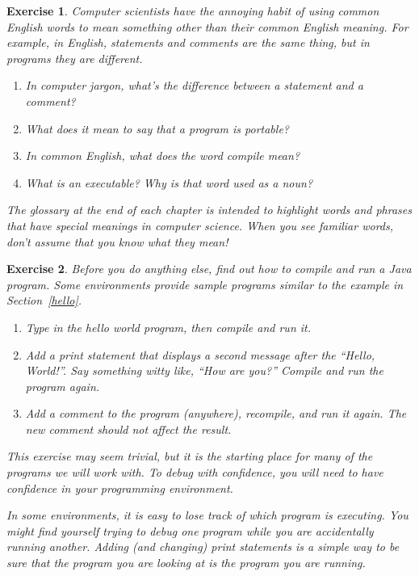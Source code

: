\documentclass[12pt]{book}
\theoremstyle{exercise}
\newtheorem{exercise}{Exercise}[chapter]
\begin{document}
\begin{exercise}

Computer scientists have the annoying habit of using common English words to mean something other than their common English meaning.
For example, in English, statements and comments are the same thing, but in programs they are different.

\begin{enumerate}
\item In computer jargon, what's the difference between a statement and a comment?
\item What does it mean to say that a program is portable?
\item In common English, what does the word compile mean?
\item What is an executable? Why is that word used as a noun?
\end{enumerate}

The glossary at the end of each chapter is intended to highlight words and phrases that have special meanings in computer science.
When you see familiar words, don't assume that you know what they mean!

\end{exercise}


\begin{exercise}

Before you do anything else, find out how to compile and run a Java program.
Some environments provide sample programs similar to the example in Section~\ref{hello}.

\begin{enumerate}
\item Type in the hello world program, then compile and run it.

\item Add a print statement that displays a second message after the ``Hello, World!''.
Say something witty like, ``How are you?''
Compile and run the program again.

\item Add a comment to the program (anywhere), recompile, and run it again.
The new comment should not affect the result.
\end{enumerate}

This exercise may seem trivial, but it is the starting place for many of the programs we will work with.
To debug with confidence, you will need to have confidence in your programming environment.

In some environments, it is easy to lose track of which program is executing.
You might find yourself trying to debug one program while you are accidentally running another.
Adding (and changing) print statements is a simple way to be sure that the program you are looking at is the program you are running.

\end{exercise}
\end{document}
